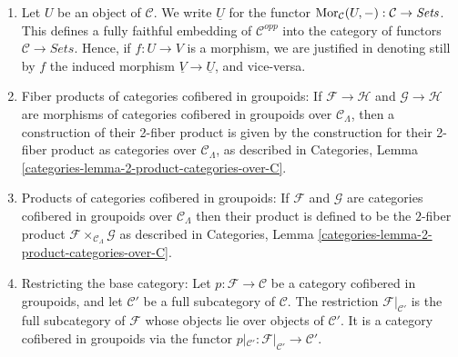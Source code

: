 \begin{remarks}
\begin{enumerate}
Hence if $F : \mathcal{C} \to \textit{Sets}$ is a functor, we denote the
associated category cofibered in sets also by $F$; and if
$\varphi : F \to G$ is a morphism of functors, we denote still by $\varphi$
the corresponding morphism of categories cofibered in sets, and vice-versa.
See Categories, Section \ref{categories-section-fibred-in-sets}.
\item
\label{item-definition-yoneda}
Let $U$ be an object of $\mathcal{C}$.  We write $\underline{U}$ for the
functor
$\mathop{\mathrm{Mor}}\nolimits_\mathcal{C}(U, -): \mathcal{C} \to
\textit{Sets}$.  This defines a fully faithful embedding of $\mathcal
C^{opp}$ into the category of functors $\mathcal{C} \to
\textit{Sets}$. Hence, if $f : U \to V$ is a morphism, we are
justified in denoting still by $f$ the induced morphism $\underline{V}
\to \underline{U}$, and vice-versa.
\item
\label{item-fibre-product}
Fiber products of categories cofibered in groupoids: If $\mathcal{F}
\to \mathcal{H}$ and $\mathcal{G} \to \mathcal{H}$ are morphisms
of categories cofibered in groupoids over $\mathcal{C}_\Lambda$, then a
construction of their 2-fiber product is given by the construction for their
2-fiber product as categories over $\mathcal{C}_\Lambda$, as described in
Categories, Lemma \ref{categories-lemma-2-product-categories-over-C}.
\item
\label{item-product}
Products of categories cofibered in groupoids: If $\mathcal{F}$ and
$\mathcal{G}$ are categories cofibered in groupoids over
$\mathcal{C}_\Lambda$ then their product is defined to be the $2$-fiber product
$\mathcal{F} \times_{\mathcal{C}_\Lambda} \mathcal{G}$ as described in
Categories, Lemma \ref{categories-lemma-2-product-categories-over-C}.
\item
\label{item-definition-restricting-base-category}
Restricting the base category: Let $p : \mathcal{F} \to \mathcal{C}$ be a
category cofibered in groupoids, and let $\mathcal{C}'$ be a full
subcategory of $\mathcal{C}$. The restriction $\mathcal{F}|_{\mathcal{C}'}$
is the full subcategory of $\mathcal{F}$ whose objects lie over
objects of $\mathcal{C}'$. It is a category cofibered in groupoids via
the functor
$p|_{\mathcal{C}'}: \mathcal{F}|_{\mathcal{C}'} \to \mathcal{C}'$.
\end{enumerate}
\end{remarks}









